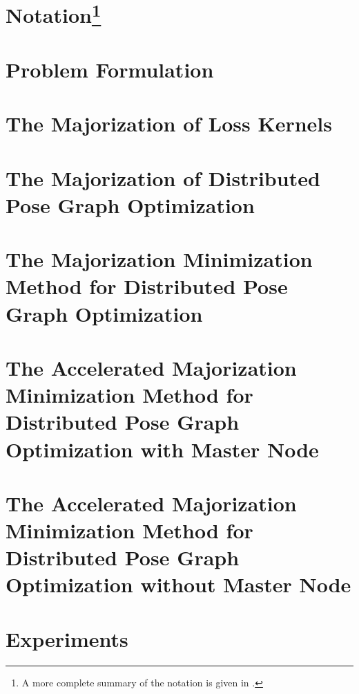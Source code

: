 \documentclass[journal]{IEEEtran}
\newcommand{\hyperapp}[2]{\cite[Appendix {#2}]{fan2021mm_full}}
\begin{document}
	\vspace{-0.2em}
	\section{Notation\protect\footnote{A more complete summary of the notation  is given in \hyperapp{appendix::A}{A}. }}\label{section::notation}
	
	
	\section{Problem Formulation}\label{section::problem}
	
	
	\section{The Majorization of Loss Kernels}\label{section::loss}
	
	
	\section{The Majorization of Distributed Pose Graph Optimization}\label{section::major_pgo}
	
	
	\section{The Majorization Minimization Method for Distributed Pose Graph Optimization}\label{section::mm}
	
	
	\section{The Accelerated Majorization Minimization Method for Distributed Pose Graph Optimization with Master Node}\label{section::ammc}
	
	
	\section{The Accelerated Majorization Minimization Method for Distributed Pose Graph Optimization without Master Node}\label{section::amm}
	
	
	\section{Experiments}\label{section::experiemnt}
	
	
\end{document}
